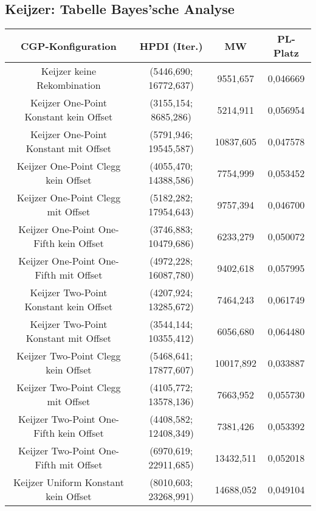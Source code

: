 \subsection{Keijzer: Tabelle Bayes'sche Analyse}
\label{subsec:appendixTabelleBayesKeijzer}
\begin{table}[H]
	\centering
	\begin{tabular}{c | c | c | c}
		\textbf{CGP-Konfiguration} & \textbf{HPDI (Iter.)} & \textbf{MW} & \textbf{PL-Platz}\\
		\hline
		Keijzer keine Rekombination & (5446,690; 16772,637) & 9551,657 & 0,046669\\
		\hline
		\hline
		Keijzer One-Point Konstant kein Offset & \color{Green}(3155,154; 8685,286)\color{black} & \color{Green}5214,911\color{black} & 0,056954\\
		\hline
		Keijzer One-Point Konstant mit Offset & (5791,946; 19545,587) & 10837,605 & 0,047578\\
		\hline
		Keijzer One-Point Clegg kein Offset & (4055,470; 14388,586) & 7754,999 & 0,053452\\
		\hline
		Keijzer One-Point Clegg mit Offset & (5182,282; 17954,643) & 9757,394 & 0,046700\\
		\hline
		Keijzer One-Point One-Fifth kein Offset & \color{Green}(3746,883; 10479,686)\color{black} & 6233,279 & 0,050072\\
		\hline
		Keijzer One-Point One-Fifth mit Offset & (4972,228; 16087,780) & 9402,618 & 0,057995\\
		\hline
		\hline
		Keijzer Two-Point Konstant kein Offset & (4207,924; 13285,672) & 7464,243 & 0,061749\\
		\hline
		Keijzer Two-Point Konstant mit Offset & \color{Green}(3544,144; 10355,412)\color{black} & \color{Green}6056,680\color{black} & \color{Green}0,064480\color{black}\\
		\hline
		Keijzer Two-Point Clegg kein Offset & (5468,641; 17877,607) & 10017,892 & \color{red}0,033887\color{black}\\
		\hline
		Keijzer Two-Point Clegg mit Offset & (4105,772; 13578,136) & 7663,952 & 0,055730\\
		\hline
		Keijzer Two-Point One-Fifth kein Offset & (4408,582; 12408,349) & 7381,426 & 0,053392\\
		\hline
		Keijzer Two-Point One-Fifth mit Offset & \color{red}(6970,619; 22911,685)\color{black} & \color{red}13432,511\color{black} & 0,052018\\
		\hline
		\hline
		Keijzer Uniform Konstant kein Offset & \color{red}(8010,603; 23268,991)\color{black} & \color{red}14688,052\color{black} & 0,049104\\

\end{tabular}
\end{table}
